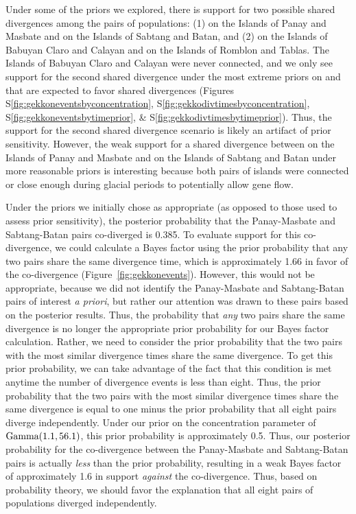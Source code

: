Under some of the priors we explored, there is support for two possible shared
divergences among the pairs of  populations:
(1)
 on the Islands of Panay and Masbate
and
 on the Islands of Sabtang and Batan,
and (2)
 on the Islands of Babuyan Claro and Calayan
and
 on the Islands of Romblon and Tablas.
The Islands of Babuyan Claro and Calayan were never connected,
and we only see support for the second shared divergence
under the most extreme priors on \concentration and
\divtime that are expected to favor shared divergences
(Figures
S\ref{fig:gekkoneventsbyconcentration},
S\ref{fig:gekkodivtimesbyconcentration},
S\ref{fig:gekkoneventsbytimeprior},
\&
S\ref{fig:gekkodivtimesbytimeprior}).
Thus, the support for the second shared divergence scenario is likely an
artifact of prior sensitivity.
However, the weak support for a shared divergence between
 on the Islands of Panay and Masbate
and
 on the Islands of Sabtang and Batan
under more reasonable priors is interesting because both pairs of islands were
connected or close enough during glacial periods to potentially allow gene
flow.

Under the priors we initially chose as appropriate (as opposed to those used to
assess prior sensitivity), the posterior probability that the Panay-Masbate and
Sabtang-Batan pairs co-diverged is 0.385.
To evaluate support for this co-divergence, we could calculate a Bayes factor
using the prior probability that any two pairs share the same divergence time,
which is approximately 1.66 in favor of the co-divergence
(Figure~\ref{fig:gekkonevents}).
However, this would not be appropriate, because we did not identify the
Panay-Masbate and Sabtang-Batan pairs of interest \emph{a priori},
but rather our attention was drawn to these pairs based on the posterior
results.
Thus, the probability that \emph{any} two pairs share the same divergence
is no longer the appropriate prior probability for our Bayes factor calculation.
Rather, we need to consider the prior probability that the two pairs with
the most similar divergence times share the same divergence.
To get this prior probability, we can take advantage of the fact that this
condition is met anytime the number of divergence events is less than eight.
Thus, the prior probability that the two pairs with the most similar divergence
times share the same divergence is equal to one minus the prior probability
that all eight pairs diverge independently.
Under our prior on the concentration parameter of $\textrm{Gamma}(1.1, 56.1)$,
this prior probability is approximately 0.5.
Thus, our posterior probability for the co-divergence between the Panay-Masbate
and Sabtang-Batan pairs is actually \emph{less} than the prior probability,
resulting in a weak Bayes factor of approximately 1.6 in support \emph{against}
the co-divergence.
Thus, based on probability theory, we should favor the explanation that all
eight pairs of  populations diverged independently.

